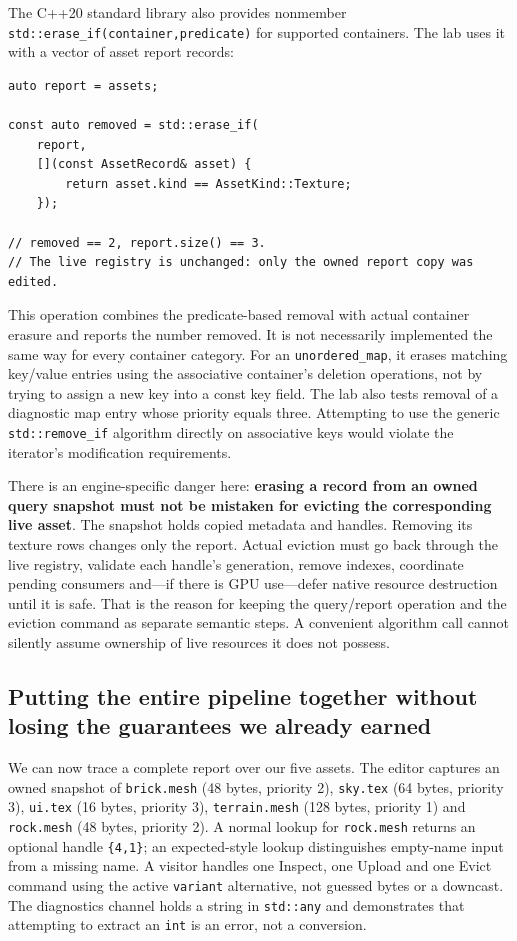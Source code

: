 The C++20 standard library also provides nonmember \texttt{std::erase\_if(container,predicate)} for supported containers. The lab uses it with a vector of asset report records:

\begin{verbatim}
auto report = assets;

const auto removed = std::erase_if(
    report,
    [](const AssetRecord& asset) {
        return asset.kind == AssetKind::Texture;
    });

// removed == 2, report.size() == 3.
// The live registry is unchanged: only the owned report copy was edited.
\end{verbatim}

This operation combines the predicate-based removal with actual container erasure and reports the number removed. It is not necessarily implemented the same way for every container category. For an \texttt{unordered\_map}, it erases matching key/value entries using the associative container's deletion operations, not by trying to assign a new key into a const key field. The lab also tests removal of a diagnostic map entry whose priority equals three. Attempting to use the generic \texttt{std::remove\_if} algorithm directly on associative keys would violate the iterator's modification requirements.

There is an engine-specific danger here: \textbf{erasing a record from an owned query snapshot must not be mistaken for evicting the corresponding live asset}. The snapshot holds copied metadata and handles. Removing its texture rows changes only the report. Actual eviction must go back through the live registry, validate each handle's generation, remove indexes, coordinate pending consumers and---if there is GPU use---defer native resource destruction until it is safe. That is the reason for keeping the query/report operation and the eviction command as separate semantic steps. A convenient algorithm call cannot silently assume ownership of live resources it does not possess.

\subsection{Putting the entire pipeline together without losing the guarantees we already earned}\label{01-foundations-i-ch006-putting-the-entire-pipeline-together-without-losing-the-guarantees-we-already-earned}

We can now trace a complete report over our five assets. The editor captures an owned snapshot of \texttt{brick.mesh} (48 bytes, priority 2), \texttt{sky.tex} (64 bytes, priority 3), \texttt{ui.tex} (16 bytes, priority 3), \texttt{terrain.mesh} (128 bytes, priority 1) and \texttt{rock.mesh} (48 bytes, priority 2). A normal lookup for \texttt{rock.mesh} returns an optional handle \texttt{\{4,1\}}; an expected-style lookup distinguishes empty-name input from a missing name. A visitor handles one Inspect, one Upload and one Evict command using the active \texttt{variant} alternative, not guessed bytes or a downcast. The diagnostics channel holds a string in \texttt{std::any} and demonstrates that attempting to extract an \texttt{int} is an error, not a conversion.


